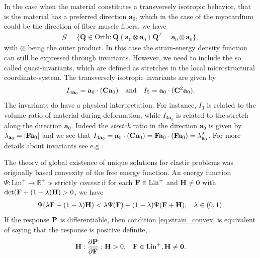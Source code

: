 In the case when the material constitutes a transversely isotropic
behavior, that is the material has a preferred direction $\mathbf{a}_0$,
which in the case of the myocardium could be the direction of fiber
muscle fibers, we have
\begin{align*}
  \mathcal{G} = \{ \mathbf{Q} \in \mathrm{Orth}: \mathbf{Q}(\mathbf{a}_0\otimes\mathbf{a}_0)\mathbf{Q}^T = \mathbf{a}_0\otimes\mathbf{a}_0 \},
\end{align*}
with $\otimes$ being the outer product. In this case the strain-energy
density function can still be expressed through invariants. However,
we need to include the so called quasi-invariants, which are defined
as stretches in the local microstructural coordinate-system. The
transversely isotropic invariants are given by
\begin{align*}
  I_{4\mathbf{a}_0 } = \mathbf{a}_0 \cdot (\mathbf{C} \mathbf{a}_0) && \text{and} && I_5 = \mathbf{a}_0 \cdot (\mathbf{C}^2 \mathbf{a}_0).
\end{align*}
The invariants do have a physical interpretation. For instance, $I_3$
is related to the volume ratio of material during deformation, while
$I_{4\mathbf{a}_0 } $ is related to the stretch along the direction
$\mathbf{a}_0 $. Indeed the \emph{stretch} ratio in the direction
$\mathbf{a}_0$ is given by $\lambda_{\mathbf{a}_0} = | \mathbf{F} \mathbf{a}_0
|$ and we see that $I_{4\mathbf{a}_0 }  =  \mathbf{a}_0 \cdot (\mathbf{C}
\mathbf{a}_0) = \mathbf{F} \mathbf{a}_0 \cdot (\mathbf{F} \mathbf{a}_0) =
\lambda_{\mathbf{a}_0}^2$. For more details about invariants see e.g
\cite{holzapfel2009constitutive,liu1982representations}.


The theory of global existence of unique solutions for elastic problems
was originally based convexity of the free energy function.
An energy function $\Psi: \mathrm{Lin}^+ \rightarrow
\mathbb{R}^+$ is strictly \emph{convex} if for each $\mathbf{F} \in
\mathrm{Lin}^+$ and $\mathbf{H} \neq \mathbf{0}$ with $\det (\mathbf{F} +
(1-\lambda)\mathbf{H}) > 0$, we have
\begin{align}
  \Psi(\lambda \mathbf{F} + (1-\lambda) \mathbf{H})
  < \lambda \Psi(\mathbf{F})
  + (1-\lambda) \Psi(\mathbf{F} + \mathbf{H}), && \lambda \in (0,1).
\label{eq:strain_convex}
\end{align}
If the response $\mathbf{P}$ is differentiable, then condition
\eqref{eq:strain_convex} is equivalent of saying that the response is
positive definite, 
\begin{align}
  \mathbf{H} : \frac{\partial \mathbf{P}}{\partial \mathbf{F}} : \mathbf{H} > 0,
  && \mathbf{F} \in
     \mathrm{Lin}^+, \mathbf{H} \neq \mathbf{0}.
\label{eq:response_posdev}
\end{align}

